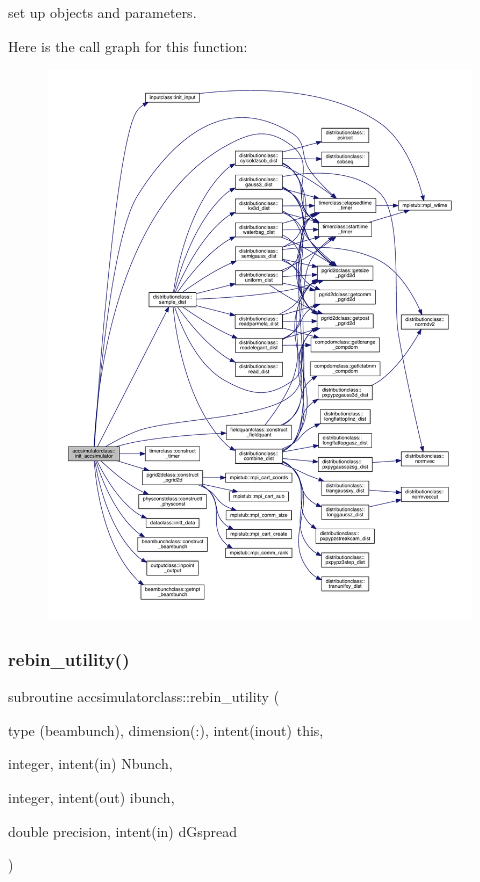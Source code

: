 set up objects and parameters. 

Here is the call graph for this function\+:\nopagebreak
\begin{figure}[H]
\begin{center}
\leavevmode
\includegraphics[width=350pt]{namespaceaccsimulatorclass_a6a90186281758191cfa3ef4fc9c54078_cgraph}
\end{center}
\end{figure}
\mbox{\label{namespaceaccsimulatorclass_af2b7d5e3857ef686e1fb07f1d6abc800}} 
\subsubsection{\texorpdfstring{rebin\_utility()}{rebin\_utility()}}
{\footnotesize\ttfamily subroutine accsimulatorclass\+::rebin\+\_\+utility (\begin{DoxyParamCaption}\item[{type (beambunch), dimension(\+:), intent(inout)}]{this,  }\item[{integer, intent(in)}]{Nbunch,  }\item[{integer, intent(out)}]{ibunch,  }\item[{double precision, intent(in)}]{d\+Gspread }\end{DoxyParamCaption})}

